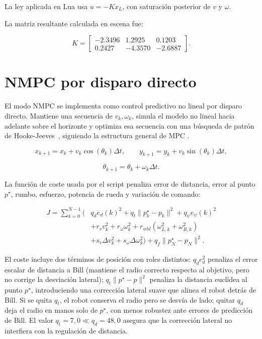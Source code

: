 La ley aplicada en Lua usa \(u=-Kx_L\), con saturación posterior de \(v\) y
\(\omega\).

La matriz resultante calculada en escena fue:

\[
K=
\begin{bmatrix}
-2.3496 & 1.2925 & 0.1203\\
0.2427 & -4.3570 & -2.6887
\end{bmatrix}.
\]


\section{NMPC por disparo directo}
\label{sec:nmpc}

El modo NMPC se implementa como control predictivo no lineal por disparo
directo. Mantiene una secuencia de \(v_k,\omega_k\), simula el modelo no lineal
hacia adelante sobre el horizonte y optimiza esa secuencia con una búsqueda de
patrón de Hooke-Jeeves~\cite{hooke1961}, siguiendo la estructura general de MPC
\cite{rawlings2017}.

\[
x_{k+1}=x_k+v_k\cos(\theta_k)\Delta t,
\qquad
y_{k+1}=y_k+v_k\sin(\theta_k)\Delta t,
\]

\[
\theta_{k+1}=\theta_k+\omega_k\Delta t.
\]

La función de coste usada por el script penaliza error de distancia, error al
punto \(p^\star\), rumbo, esfuerzo, potencia de rueda y variación de comando:

\[
\begin{aligned}
J = \sum_{k=0}^{N-1}(&
q_d e_d(k)^2 + q_t\|p^\star_k-p_k\|^2
+ q_\psi e_\psi(k)^2 \\
&+ r_v v_k^2 + r_\omega \omega_k^2
+ r_{whl}(\omega_{L,k}^2+\omega_{R,k}^2)\\
&+ s_v\Delta v_k^2+s_\omega\Delta\omega_k^2)
+ q_f\|p^\star_N-p_N\|^2 .
\end{aligned}
\]

El coste incluye dos términos de posición con roles distintos: \(q_d e_d^2\)
penaliza el error escalar de distancia a Bill (mantiene el radio correcto
respecto al objetivo, pero no corrige la desviación lateral); \(q_t\|p^\star-p\|^2\)
penaliza la distancia euclídea al punto \(p^\star\), introduciendo una corrección
lateral suave que alinea el robot detrás de Bill. Si se quita \(q_t\), el robot
conserva el radio pero se desvía de lado; quitar \(q_d\) deja el radio en manos
solo de \(p^\star\), con menos robustez ante errores de predicción de Bill.
El valor \(q_t=7{,}0\ll q_d=48{,}0\) asegura que la corrección lateral no
interfiera con la regulación de distancia.

